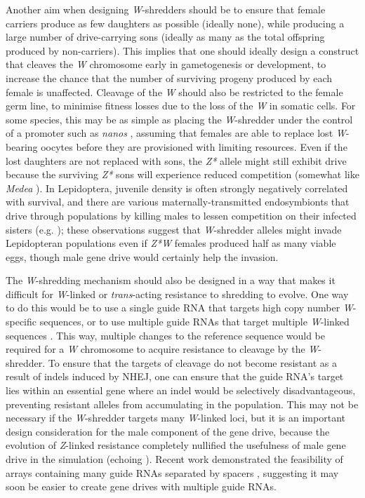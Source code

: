 \documentclass[]{rsos}%
\begin{document}
Another aim when designing \emph{W}-shredders should be to ensure that
female carriers produce as few daughters as possible (ideally none),
while producing a large number of drive-carrying sons (ideally as many
as the total offspring produced by non-carriers). This implies that one
should ideally design a construct that cleaves the \emph{W} chromosome
early in gametogenesis or development, to increase the chance that the
number of surviving progeny produced by each female is unaffected.
Cleavage of the \emph{W} should also be restricted to the female germ
line, to minimise fitness losses due to the loss of the \emph{W} in
somatic cells. For some species, this may be as simple as placing the
\emph{W}-shredder under the control of a promoter such as \emph{nanos}
\citep{champer2018re, zhang2018si}, assuming that females are able to
replace lost \emph{W}-bearing oocytes before they are provisioned with
limiting resources. Even if the lost daughters are not replaced with
sons, the \emph{Z*} allele might still exhibit drive because the
surviving \emph{Z*} sons will experience reduced competition (somewhat
like \emph{Medea} \citep{hay2010en}). In Lepidoptera, juvenile density
is often strongly negatively correlated with survival, and there are
various maternally-transmitted endosymbionts that drive through
populations by killing males to lessen competition on their infected
sisters (e.g. \citep{jiggins2000bu, jiggins2003ma}); these observations
suggest that \emph{W}-shredder alleles might invade Lepidopteran
populations even if \emph{Z*W} females produced half as many viable
eggs, though male gene drive would certainly help the invasion.

The \emph{W}-shredding mechanism should also be designed in a way that
makes it difficult for \emph{W}-linked or \emph{trans}-acting resistance
to shredding to evolve. One way to do this would be to use a single
guide RNA that targets high copy number \emph{W}-specific sequences, or
to use multiple guide RNAs that target multiple \emph{W}-linked
sequences \citep{champer2018re}. This way, multiple changes to the
reference sequence would be required for a \emph{W} chromosome to
acquire resistance to cleavage by the \emph{W}-shredder. To ensure that
the targets of cleavage do not become resistant as a result of indels
induced by NHEJ, one can ensure that the guide RNA's target lies within
an essential gene where an indel would be selectively disadvantageous,
preventing resistant alleles from accumulating in the population. This
may not be necessary if the \emph{W}-shredder targets many
\emph{W}-linked loci, but it is an important design consideration for
the male component of the gene drive, because the evolution of
\emph{Z}-linked resistance completely nullified the usefulness of male
gene drive in the simulation (echoing \citep{unckless2017ev}). Recent
work demonstrated the feasibility of arrays containing many guide RNAs
separated by spacers \citep{kurata2018hi}, suggesting it may soon be
easier to create gene drives with multiple guide RNAs.
\end{document}
